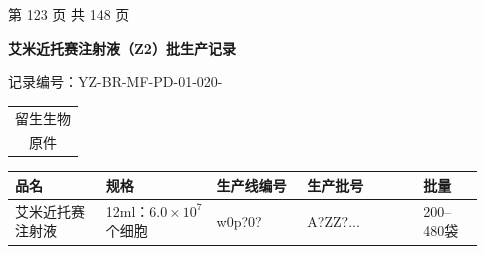 \documentclass[UTF8,10pt,a4paper,fontset=fandol]{ctexart}
\newcommand{\fieldvalue}[1]{#1}
\newcommand{\handwritten}[1]{#1}
\begin{document}
\begin{center}
第 123 页 共 148 页
\end{center}

\newpage

\begin{center}
\textbf{艾米近托赛注射液（Z2）批生产记录}
\end{center}

\noindent
记录编号：YZ-BR-MF-PD-01-020-\hfill
\begin{tabular}{|c|}
\hline
留生生物\\[-2pt]
\fieldvalue{\handwritten{原件}}\\
\hline
\end{tabular}

\vspace{2pt}

\begin{tabular}{|p{0.18\linewidth}|p{0.22\linewidth}|p{0.18\linewidth}|p{0.23\linewidth}|p{0.12\linewidth}|}
\hline
\centering 品名 &
\centering 规格 &
\centering 生产线编号 &
\centering 生产批号 &
\centering 批量
\\ \hline
\fieldvalue{艾米近托赛注射液} &
\fieldvalue{12ml：$6.0\times 10^{7}$个细胞} &
\fieldvalue{\handwritten{w0p?0?}} &
\fieldvalue{\handwritten{A?ZZ?...}} &
\fieldvalue{200--480袋}
\\ \hline
\end{tabular}

\vspace{3pt}
\end{document}

